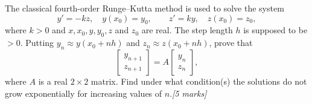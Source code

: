 \documentclass[11pt,a4paper]{article}
\newcommand{\mk}[1]{\hfill\textit{[#1 marks]}}
\begin{document}
\begin{qbox}
The classical fourth-order Runge--Kutta method is used to solve the
system
\[
  y'=-kz,\quad y(x_0)=y_0,\qquad z'=ky,\quad z(x_0)=z_0,
\]
where \(k>0\) and \(x,x_0,y,y_0,z\) and \(z_0\) are real.  The step
length \(h\) is supposed to be \(>0\).  Putting
\(y_n\approx y(x_0+nh)\) and \(z_n\approx z(x_0+nh)\), prove that
\[
  \begin{bmatrix}y_{n+1}\\ z_{n+1}\end{bmatrix}
  =A\begin{bmatrix}y_n\\ z_n\end{bmatrix},
\]
where \(A\) is a real \(2\times2\) matrix.  Find under what
condition(s) the solutions do not grow exponentially for increasing
values of \(n\).\mk{5}
\end{qbox}
\end{document}
